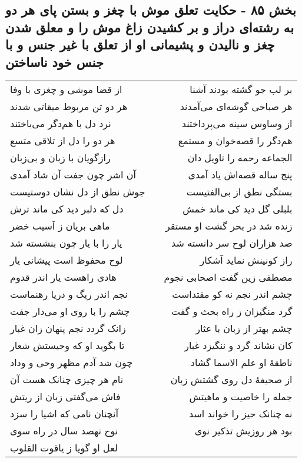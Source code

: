 \begin{center}
\section*{بخش ۸۵ - حکایت تعلق موش با چغز و بستن پای هر دو به رشته‌ای دراز و بر کشیدن زاغ موش را و معلق شدن چغز و نالیدن و پشیمانی او از تعلق با غیر جنس و با جنس خود ناساختن}
\label{sec:sh085}
\begin{longtable}{l p{0.5cm} r}
از قضا موشی و چغزی با وفا
&&
بر لب جو گشته بودند آشنا
\\
هر دو تن مربوط میقاتی شدند
&&
هر صباحی گوشه‌ای می‌آمدند
\\
نرد دل با هم‌دگر می‌باختند
&&
از وساوس سینه می‌پرداختند
\\
هر دو را دل از تلاقی متسع
&&
هم‌دگر را قصه‌خوان و مستمع
\\
رازگویان با زبان و بی‌زبان
&&
الجماعه رحمه را تاویل دان
\\
آن اشر چون جفت آن شاد آمدی
&&
پنج ساله قصه‌اش یاد آمدی
\\
جوش نطق از دل نشان دوستیست
&&
بستگی نطق از بی‌الفتیست
\\
دل که دلبر دید کی ماند ترش
&&
بلبلی گل دید کی ماند خمش
\\
ماهی بریان ز آسیب خضر
&&
زنده شد در بحر گشت او مستقر
\\
یار را با یار چون بنشسته شد
&&
صد هزاران لوح سر دانسته شد
\\
لوح محفوظ است پیشانی یار
&&
راز کونینش نماید آشکار
\\
هادی راهست یار اندر قدوم
&&
مصطفی زین گفت اصحابی نجوم
\\
نجم اندر ریگ و دریا رهنماست
&&
چشم اندر نجم نه کو مقتداست
\\
چشم را با روی او می‌دار جفت
&&
گرد منگیزان ز راه بحث و گفت
\\
زانک گردد نجم پنهان زان غبار
&&
چشم بهتر از زبان با عثار
\\
تا بگوید او که وحیستش شعار
&&
کان نشاند گرد و ننگیزد غبار
\\
چون شد آدم مظهر وحی و وداد
&&
ناطقهٔ او علم الاسما گشاد
\\
نام هر چیزی چنانک هست آن
&&
از صحیفهٔ دل روی گشتش زبان
\\
فاش می‌گفتی زبان از ریتش
&&
جمله را خاصیت و ماهیتش
\\
آنچنان نامی که اشیا را سزد
&&
نه چنانک حیز را خواند اسد
\\
نوح نهصد سال در راه سوی
&&
بود هر روزیش تذکیر نوی
\\
لعل او گویا ز یاقوت القلوب

\end{longtable}
\end{center}
